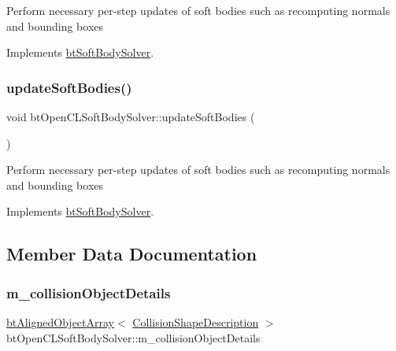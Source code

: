 Perform necessary per-\/step updates of soft bodies such as recomputing normals and bounding boxes 

Implements \hyperlink{classbtSoftBodySolver_adac4b4f20eee46dc4fab26ed25be89ef}{bt\+Soft\+Body\+Solver}.

\mbox{\label{classbtOpenCLSoftBodySolver_ae37f7bd6f4ab0c4b8eb26fb1c104644a}} 
\subsubsection{\texorpdfstring{update\+Soft\+Bodies()}{updateSoftBodies()}\hspace{0.1cm}{\footnotesize\ttfamily [2/2]}}
{\footnotesize\ttfamily void bt\+Open\+C\+L\+Soft\+Body\+Solver\+::update\+Soft\+Bodies (\begin{DoxyParamCaption}{ }\end{DoxyParamCaption})\hspace{0.3cm}{\ttfamily [virtual]}}

Perform necessary per-\/step updates of soft bodies such as recomputing normals and bounding boxes 

Implements \hyperlink{classbtSoftBodySolver_adac4b4f20eee46dc4fab26ed25be89ef}{bt\+Soft\+Body\+Solver}.



\subsection{Member Data Documentation}
\mbox{\label{classbtOpenCLSoftBodySolver_a686543041f61bec0aba0e0e03db363fe}} 
\subsubsection{\texorpdfstring{m\+\_\+collision\+Object\+Details}{m\_collisionObjectDetails}}
{\footnotesize\ttfamily \hyperlink{classbtAlignedObjectArray}{bt\+Aligned\+Object\+Array}$<$ \hyperlink{structCollisionShapeDescription}{Collision\+Shape\+Description} $>$ bt\+Open\+C\+L\+Soft\+Body\+Solver\+::m\+\_\+collision\+Object\+Details\hspace{0.3cm}{\ttfamily [protected]}}


